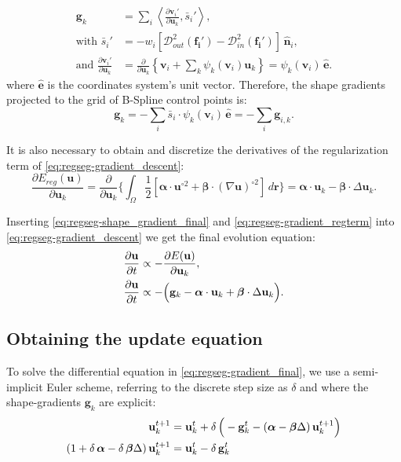 \documentclass[a4paper]{report}
\providecommand{\mdist}[2]{ \mathcal{D}_{#2}^2(\mathbf{#1}) }
\renewcommand{\vec}[1]{\mathbf{#1}}
\begin{document}
  \begin{align}
  \vec{g}_k &= \underset{i}{\sum} \left\langle \frac{\partial \vec{v}_i'}{\partial \vec{u}_k}, \bar{s}_i'\right\rangle, \\
  \text{with }
  \bar{s}_i' &= - w_i \left[ \mdist{f_i'}{out} - \mdist{f_i'}{in} \right] \, \hat{\vec{n}}_i, \\
  \text{and }
  \frac{\partial \vec{v}_i'}{\partial \vec{u}_k} &=
  \frac{\partial}{\partial \vec{u}_k} \left\{ \vec{v}_i + \sum_k \psi_k(\vec{v}_i) \vec{u}_k \right\} = \psi_k(\vec{v}_i)\, \hat{\vec{e}}.
  \label{eq:regseg-gradient_wshape}
  \end{align}%
  where $\hat{\vec{e}}$ is the coordinates system's unit vector.
Therefore, the shape gradients projected to the grid of B-Spline control points is:
\begin{equation}
  \vec{g}_k = - \underset{i}{\sum} \bar{s}_i \cdot \psi_k(\vec{v}_i) \, \hat{\vec{e}} = - \underset{i}{\sum} \vec{g}_{i,k}.
  \label{eq:regseg-shape_gradient_final}
\end{equation}

It is also necessary to obtain and discretize the derivatives of the regularization term of \eqref{eq:regseg-gradient_descent}:
  \begin{equation}
  \frac{\partial E_{reg}(\vec{u})}{\partial \vec{u}_k} = \frac{ \partial }{\partial \vec{u}_k} \Big\{
  \int_{\Omega} \frac12 [ \boldsymbol{\alpha} \cdot \vec{u}^{\circ2}
  + \boldsymbol{\beta} \cdot (\nabla \vec{u})^{\circ2} ] \,d\vec{r}
  \Big\} = \boldsymbol{\alpha} \cdot \vec{u}_k - \boldsymbol{\beta} \cdot \Delta \vec{u}_k.
  \label{eq:regseg-gradient_regterm}
  \end{equation}

Inserting \eqref{eq:regseg-shape_gradient_final} and \eqref{eq:regseg-gradient_regterm} into \eqref{eq:regseg-gradient_descent} we get the
  final evolution equation:
  \begin{align}
  \frac{\partial \vec{u}}{\partial t} &\propto - \frac{\partial E(\vec{u})}{\partial \vec{u}_k}, \notag\\
  \frac{\partial \vec{u}}{\partial t} &\propto - \Big( \vec{g}_k - \boldsymbol{\alpha} \cdot \vec{u}_k + \boldsymbol{\beta} \cdot \Delta \vec{u}_k \Big).
  \label{eq:regseg-gradient_final}
  \end{align}


\subsection{Obtaining the update equation} To solve the differential equation in \eqref{eq:regseg-gradient_final},
  we use a semi-implicit Euler scheme, referring to the discrete step size as $\delta$ and where the
  shape-gradients $\vec{g}_k$ are explicit:
\begin{align}
  \vec{u}_k^{t+1} &= \vec{u}_k^{t} + \delta \, \Big( - \vec{g}_k^{t} - ( \boldsymbol{\alpha} - \boldsymbol{\beta} \Delta) \, \vec{u}_k^{t+1} \Big) \notag \\
  (1 + \delta \, \boldsymbol{\alpha} - \delta \, \boldsymbol{\beta} \Delta)\, \vec{u}_k^{t+1} &= \vec{u}_k^{t} - \delta\, \vec{g}_k^{t}
  \label{eq:regseg-discrete_derivative}
\end{align}
\end{document}
